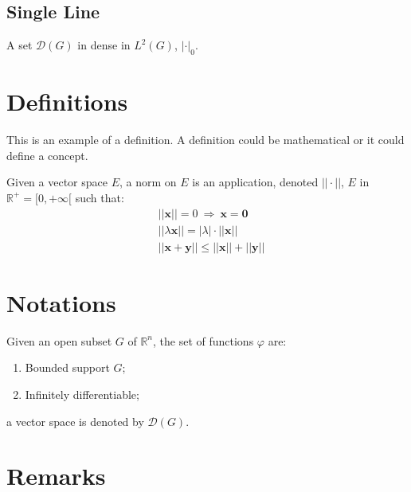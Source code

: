 \documentclass[11pt,fleqn]{book} %
\begin{document}
\subsection{Single Line}

\begin{theorem}
A set $\mathcal{D}(G)$ in dense in $L^2(G)$, $|\cdot|_0$. 
\end{theorem}


\section{Definitions}

This is an example of a definition. A definition could be mathematical or it could define a concept.

\begin{definition}
Given a vector space $E$, a norm on $E$ is an application, denoted $||\cdot||$, $E$ in $\mathbb{R}^+=[0,+\infty[$ such that:
\begin{align}
& ||\mathbf{x}||=0\ \Rightarrow\ \mathbf{x}=\mathbf{0}\\
& ||\lambda \mathbf{x}||=|\lambda|\cdot ||\mathbf{x}||\\
& ||\mathbf{x}+\mathbf{y}||\leq ||\mathbf{x}||+||\mathbf{y}||
\end{align}
\end{definition}


\section{Notations}

\begin{notation}
Given an open subset $G$ of $\mathbb{R}^n$, the set of functions $\varphi$ are:
\begin{enumerate}
\item Bounded support $G$;
\item Infinitely differentiable;
\end{enumerate}
a vector space is denoted by $\mathcal{D}(G)$. 
\end{notation}


\section{Remarks}
\end{document}
